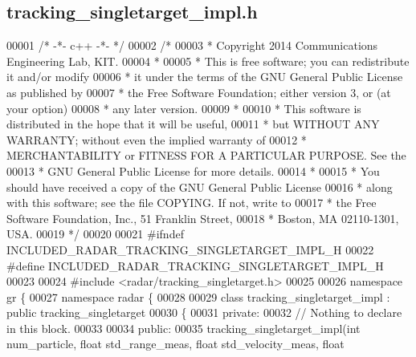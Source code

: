 \subsection{tracking\+\_\+singletarget\+\_\+impl.\+h}
\label{tracking__singletarget__impl_8h_source}

\begin{DoxyCode}
00001 \textcolor{comment}{/* -*- c++ -*- */}
00002 \textcolor{comment}{/* }
00003 \textcolor{comment}{ * Copyright 2014 Communications Engineering Lab, KIT.}
00004 \textcolor{comment}{ * }
00005 \textcolor{comment}{ * This is free software; you can redistribute it and/or modify}
00006 \textcolor{comment}{ * it under the terms of the GNU General Public License as published by}
00007 \textcolor{comment}{ * the Free Software Foundation; either version 3, or (at your option)}
00008 \textcolor{comment}{ * any later version.}
00009 \textcolor{comment}{ * }
00010 \textcolor{comment}{ * This software is distributed in the hope that it will be useful,}
00011 \textcolor{comment}{ * but WITHOUT ANY WARRANTY; without even the implied warranty of}
00012 \textcolor{comment}{ * MERCHANTABILITY or FITNESS FOR A PARTICULAR PURPOSE.  See the}
00013 \textcolor{comment}{ * GNU General Public License for more details.}
00014 \textcolor{comment}{ * }
00015 \textcolor{comment}{ * You should have received a copy of the GNU General Public License}
00016 \textcolor{comment}{ * along with this software; see the file COPYING.  If not, write to}
00017 \textcolor{comment}{ * the Free Software Foundation, Inc., 51 Franklin Street,}
00018 \textcolor{comment}{ * Boston, MA 02110-1301, USA.}
00019 \textcolor{comment}{ */}
00020 
00021 \textcolor{preprocessor}{#ifndef INCLUDED\_RADAR\_TRACKING\_SINGLETARGET\_IMPL\_H}
00022 \textcolor{preprocessor}{#define INCLUDED\_RADAR\_TRACKING\_SINGLETARGET\_IMPL\_H}
00023 
00024 \textcolor{preprocessor}{#include <radar/tracking_singletarget.h>}
00025 
00026 \textcolor{keyword}{namespace }gr \{
00027   \textcolor{keyword}{namespace }radar \{
00028 
00029     \textcolor{keyword}{class }tracking_singletarget_impl : \textcolor{keyword}{public} tracking_singletarget
00030     \{
00031      \textcolor{keyword}{private}:
00032       \textcolor{comment}{// Nothing to declare in this block.}
00033 
00034      \textcolor{keyword}{public}:
00035       tracking_singletarget_impl(\textcolor{keywordtype}{int} num\_particle, \textcolor{keywordtype}{float} std\_range\_meas, \textcolor{keywordtype}{float} std\_velocity\_meas, \textcolor{keywordtype}{float} 

\end{DoxyCode}
